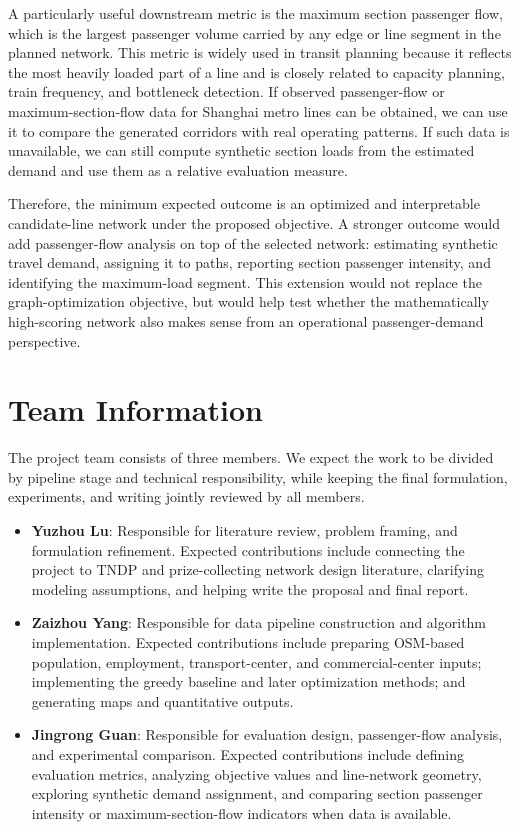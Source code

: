 \documentclass[9pt,a4paper,twocolumn,twoside]{tau-class/tau}
\begin{document}
    A particularly useful downstream metric is the maximum section passenger flow, which is the largest passenger volume carried by any edge or line segment in the planned network. This metric is widely used in transit planning because it reflects the most heavily loaded part of a line and is closely related to capacity planning, train frequency, and bottleneck detection. If observed passenger-flow or maximum-section-flow data for Shanghai metro lines can be obtained, we can use it to compare the generated corridors with real operating patterns. If such data is unavailable, we can still compute synthetic section loads from the estimated demand and use them as a relative evaluation measure.

    Therefore, the minimum expected outcome is an optimized and interpretable candidate-line network under the proposed objective. A stronger outcome would add passenger-flow analysis on top of the selected network: estimating synthetic travel demand, assigning it to paths, reporting section passenger intensity, and identifying the maximum-load segment. This extension would not replace the graph-optimization objective, but would help test whether the mathematically high-scoring network also makes sense from an operational passenger-demand perspective.
    
\section{Team Information}

    The project team consists of three members. We expect the work to be divided by pipeline stage and technical responsibility, while keeping the final formulation, experiments, and writing jointly reviewed by all members.

    \begin{itemize}
        \item \textbf{Yuzhou Lu}: Responsible for literature review, problem framing, and formulation refinement. Expected contributions include connecting the project to TNDP and prize-collecting network design literature, clarifying modeling assumptions, and helping write the proposal and final report.
        \item \textbf{Zaizhou Yang}: Responsible for data pipeline construction and algorithm implementation. Expected contributions include preparing OSM-based population, employment, transport-center, and commercial-center inputs; implementing the greedy baseline and later optimization methods; and generating maps and quantitative outputs.
        \item \textbf{Jingrong Guan}: Responsible for evaluation design, passenger-flow analysis, and experimental comparison. Expected contributions include defining evaluation metrics, analyzing objective values and line-network geometry, exploring synthetic demand assignment, and comparing section passenger intensity or maximum-section-flow indicators when data is available.
    \end{itemize}
\end{document}
